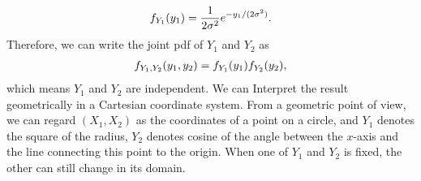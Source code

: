 \documentclass{article}
\begin{document}
\begin{CJK}{UTF8}{gbsn}
\begin{itemize}
\begin{align}
                  f_{Y_1}(y_1) = \frac{1}{2\sigma^2}e^{-y_1/(2\sigma^2)}.\notag
              \end{align}
              Therefore, we can write the joint pdf of $Y_1$ and $Y_2$ as
              \begin{align}
                  f_{Y_1,Y_2}(y_1,y_2) = f_{Y_1}(y_1)f_{Y_2}(y_2),\notag
              \end{align}
              which means $Y_1$ and $Y_2$ are independent.
              We can Interpret the result geometrically in a Cartesian coordinate system.
              From a geometric point of view, we can regard $(X_1, X_2)$ as the coordinates of a point
              on a circle, and $Y_1$ denotes the square of the radius, $Y_2$ denotes cosine of the angle
              between the $x$-axis and the line connecting this point to the origin.
              When one of $Y_1$ and $Y_2$ is fixed, the other can still change in its domain.
    \end{itemize}





\end{CJK}
\end{document}
